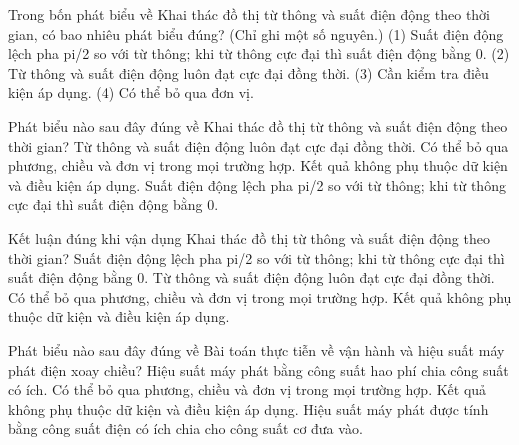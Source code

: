 \begin{ex}
Trong bốn phát biểu về Khai thác đồ thị từ thông và suất điện động theo thời gian, có bao nhiêu phát biểu đúng? (Chỉ ghi một số nguyên.) (1) Suất điện động lệch pha pi/2 so với từ thông; khi từ thông cực đại thì suất điện động bằng 0. (2) Từ thông và suất điện động luôn đạt cực đại đồng thời. (3) Cần kiểm tra điều kiện áp dụng. (4) Có thể bỏ qua đơn vị.
\end{ex}

\begin{ex}
Phát biểu nào sau đây đúng về Khai thác đồ thị từ thông và suất điện động theo thời gian?
\choice
{Từ thông và suất điện động luôn đạt cực đại đồng thời.}
{Có thể bỏ qua phương, chiều và đơn vị trong mọi trường hợp.}
{Kết quả không phụ thuộc dữ kiện và điều kiện áp dụng.}
{\True Suất điện động lệch pha pi/2 so với từ thông; khi từ thông cực đại thì suất điện động bằng 0.}
\end{ex}

\begin{ex}
Kết luận đúng khi vận dụng Khai thác đồ thị từ thông và suất điện động theo thời gian?
\choice
{\True Suất điện động lệch pha pi/2 so với từ thông; khi từ thông cực đại thì suất điện động bằng 0.}
{Từ thông và suất điện động luôn đạt cực đại đồng thời.}
{Có thể bỏ qua phương, chiều và đơn vị trong mọi trường hợp.}
{Kết quả không phụ thuộc dữ kiện và điều kiện áp dụng.}
\end{ex}

\begin{ex}
Phát biểu nào sau đây đúng về Bài toán thực tiễn về vận hành và hiệu suất máy phát điện xoay chiều?
\choice
{Hiệu suất máy phát bằng công suất hao phí chia công suất có ích.}
{Có thể bỏ qua phương, chiều và đơn vị trong mọi trường hợp.}
{Kết quả không phụ thuộc dữ kiện và điều kiện áp dụng.}
{\True Hiệu suất máy phát được tính bằng công suất điện có ích chia cho công suất cơ đưa vào.}
\end{ex}

